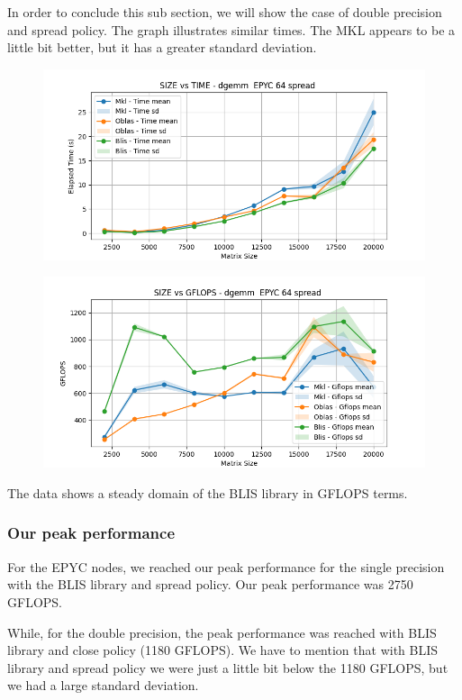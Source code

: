 \documentclass[12pt, titlepage]{report}
\begin{document}
In order to conclude this sub section, we will show the case of double precision and spread policy. 
The graph illustrates similar times. The MKL appears to be a little bit better, but it has a greater standard deviation. 
\begin{figure}[H]
    \centering
    \includegraphics[width=\textwidth]{EPYC 64/dgemm__EPYC_64_spread_time.png}
\end{figure}

\begin{figure}[H]
    \centering
    \includegraphics[width=\textwidth]{EPYC 64/dgemm__EPYC_64_spread_gflops.png}
\end{figure}

The data shows a steady domain of the BLIS library in GFLOPS terms. 

\subsubsection{Our peak performance}
For the EPYC nodes, we reached our peak performance for the single precision with the BLIS library and spread policy. Our peak performance was 2750 GFLOPS.

While, for the double precision, the peak performance was reached with BLIS library and close policy (1180 GFLOPS). We have to mention that with BLIS library and spread policy we were just a little bit below the 1180 GFLOPS, but we had a large standard deviation.
\end{document}
